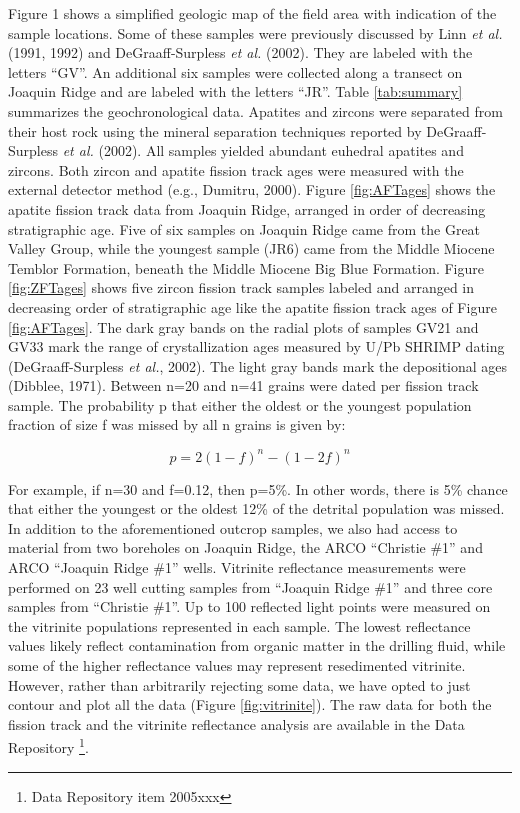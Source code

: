 \documentclass[11pt,twoside]{article}
\begin{document}
Figure  1 shows  a  simplified geologic  map  of the  field area  with
indication  of  the sample  locations.   Some  of  these samples  were
previously  discussed   by  Linn  {\it  et  al.}    (1991,  1992)  and
DeGraaff-Surpless  {\it et al.}   (2002).  They  are labeled  with the
letters  ``GV''.  An  additional six  samples were  collected  along a
transect on  Joaquin Ridge  and are labeled  with the  letters ``JR''.
Table   \ref{tab:summary}   summarizes   the  geochronological   data.
Apatites and  zircons were  separated from their  host rock  using the
mineral  separation techniques reported  by DeGraaff-Surpless  {\it et
al.}   (2002).  All  samples  yielded abundant  euhedral apatites  and
zircons.   Both zircon and  apatite fission  track ages  were measured
with  the  external detector  method  (e.g.,  Dumitru, 2000).   Figure
\ref{fig:AFTages} shows  the apatite  fission track data  from Joaquin
Ridge, arranged in order of decreasing stratigraphic age.  Five of six
samples on Joaquin  Ridge came from the Great  Valley Group, while the
youngest sample (JR6) came  from the Middle  Miocene Temblor Formation,
beneath   the    Middle    Miocene   Big    Blue   Formation.    Figure
\ref{fig:ZFTages} shows five zircon  fission track samples labeled and
arranged  in decreasing order  of stratigraphic  age like  the apatite
fission track  ages of Figure \ref{fig:AFTages}.  The  dark gray bands
on  the radial  plots  of samples  GV21  and GV33  mark  the range  of
crystallization ages measured by U/Pb SHRIMP dating (DeGraaff-Surpless
{\it et al.}, 2002).  The  light gray bands mark the depositional ages
(Dibblee, 1971). Between  n=20 and n=41 grains were  dated per fission
track sample. The probability p that either the oldest or the youngest
population fraction of size f was missed by all n grains is given by:

$$p  = 2(1-f)^n - (1-2f)^n$$

For example, if n=30 and f=0.12,  then p=5\%. In other words, there is
5\% chance that either the youngest or the oldest 12\% of the detrital
population  was  missed. In  addition  to  the aforementioned  outcrop
samples, we also had access  to material from two boreholes on Joaquin
Ridge, the ARCO ``Christie \#1'' and ARCO ``Joaquin Ridge \#1'' wells.
Vitrinite reflectance  measurements were performed on  23 well cutting
samples  from  ``Joaquin  Ridge  \#1''  and three  core  samples  from
``Christie \#1''.  Up  to 100 reflected light points  were measured on
the  vitrinite populations  represented  in each  sample.  The  lowest
reflectance values likely reflect contamination from organic matter in
the drilling  fluid, while some  of the higher reflectance  values may
represent  resedimented vitrinite.   However, rather  than arbitrarily
rejecting some  data, we have opted  to just contour and  plot all the
data (Figure \ref{fig:vitrinite}).  The  raw data for both the fission
track and the vitrinite reflectance analysis are available in the Data
Repository \footnote[1]{Data Repository item 2005xxx}.
\end{document}
